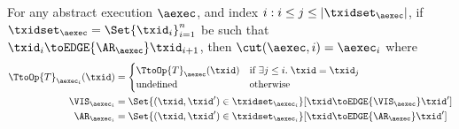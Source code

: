 \begin{lemma}[Prefix]
\label{lem:cut.explicit}
For any abstract execution $\aexec$, and index $i: i \leq j \leq \lvert \txidset_{\aexec} \rvert$, 
if $\txidset_{\aexec} = \Set{\txid_{i}}_{i=1}^{n}$ be such that 
$\txid_{i} \toEDGE{\AR_{\aexec}} \txid_{i+1}$, 
then $\cut(\aexec, i) = \aexec_{i}$ where 
\begin{align*}
\TtoOp{T}_{\aexec_{i}}(\txid) &=
\begin{cases}
\TtoOp{T}_{\aexec}(\txid) & \text{if } \exists j \leq i.\; \txid = \txid_{j}\\
\text{undefined} & \text{otherwise}\\
\end{cases} \\
\VIS_{\aexec_{i}} &= \Set{ (\txid, \txid') \in \txidset_{\aexec_{i}} }[ \txid \toEDGE{\VIS_{\aexec}} \txid'] \\
\AR_{\aexec_{i}} &= \Set{ (\txid, \txid') \in \txidset_{\aexec_{i}} }[ \txid \toEDGE{\AR_{\aexec}} \txid']
\end{align*}
\end{lemma}

